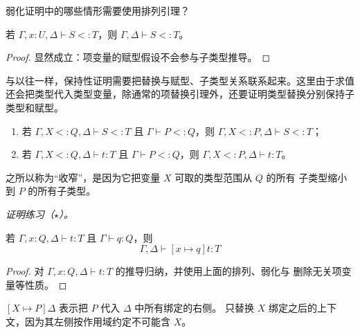 \begin{exercise}[\(\star\)]
\label{ex:26.4.3}
弱化证明中的哪些情形需要使用排列引理？
\end{exercise}

\begin{lemma}[子类型推导中可删除无关项变量]
\label{lem:26.4.4}
若 \(\Gamma,x:U,\Delta\vdash S<:T\)，则
\(\Gamma,\Delta\vdash S<:T\)。
\end{lemma}

\begin{proof}
显然成立：项变量的赋型假设不会参与子类型推导。
\end{proof}

与以往一样，保持性证明需要把替换与赋型、子类型关系联系起来。这里由于求值
还会把类型代入类型变量，除通常的项替换引理外，还要证明类型替换分别保持子
类型和赋型。

\taplstatementliststart
\begin{lemma}[收窄]
\label{lem:26.4.5}
\taplstatementlistbreak
\begin{enumerate}
  \item 若 \(\Gamma,X<:Q,\Delta\vdash S<:T\) 且
        \(\Gamma\vdash P<:Q\)，则
        \(\Gamma,X<:P,\Delta\vdash S<:T\)；
  \item 若 \(\Gamma,X<:Q,\Delta\vdash t:T\) 且
        \(\Gamma\vdash P<:Q\)，则
        \(\Gamma,X<:P,\Delta\vdash t:T\)。
\end{enumerate}
之所以称为“收窄”，是因为它把变量 \(X\) 可取的类型范围从 \(Q\) 的所有
子类型缩小到 \(P\) 的所有子类型。
\end{lemma}
\noindent\textit{证明练习（\(\star\)）。}

\begin{lemma}[项替换保持赋型]
\label{lem:26.4.6}
若 \(\Gamma,x:Q,\Delta\vdash t:T\) 且 \(\Gamma\vdash q:Q\)，则
\[
\Gamma,\Delta\vdash[x\mapsto q]t:T
\]
\end{lemma}

\begin{proof}
对 \(\Gamma,x:Q,\Delta\vdash t:T\) 的推导归纳，并使用上面的排列、弱化与
删除无关项变量等性质。
\end{proof}

\begin{definition}
\label{def:26.4.7}
\([X\mapsto P]\Delta\) 表示把 \(P\) 代入 \(\Delta\) 中所有绑定的右侧。
只替换 \(X\) 绑定之后的上下文，因为其左侧按作用域约定不可能含 \(X\)。
\end{definition}

